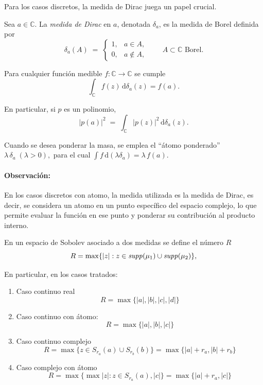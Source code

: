 Para los casos discretos, la medida de Dirac juega un papel crucial.

\begin{definition}\label{def:dirac_measure}
  Sea $a\in\mathbb{C}$.
  La \emph{medida de Dirac} en $a$, denotada $\delta_{a}$, es la medida de Borel definida por
  \[
    \delta_{a}(A)\;=\;
    \begin{cases}
      1, & a\in A,    \\
      0, & a\notin A,
    \end{cases}
    \qquad A\subset\mathbb C \text{ Borel}.
  \]

  Para cualquier función medible \(f\colon\mathbb{C}\to\mathbb{C}\) se cumple
  \[
    \int_{\mathbb C} f(z)\,\mathrm d\delta_{a}(z)=f(a).
  \]

  En particular, si \(p\) es un polinomio,
  \[
    |p(a)|^{2}\;=\;
    \int_{\mathbb C} |p(z)|^{2}\,\mathrm d\delta_{a}(z).
  \]

  Cuando se desea ponderar la masa, se emplea el “átomo ponderado”
  \(
  \lambda\,\delta_{a}\;( \lambda>0),
  \)
  para el cual
  \(
  \displaystyle \int f\,\mathrm d(\lambda\delta_{a})=\lambda\,f(a).
  \)
\end{definition}

\paragraph{Observación:}
En los casos discretos con atomo, la medida utilizada es la medida de Dirac, es decir, se considera un atomo en un punto específico del espacio complejo, lo que permite evaluar la función en ese punto y ponderar su contribución al producto interno.

\begin{definition}
  \label{rem:R_support}
  \noindent En un espacio de Sobolev asociado a dos medidas se define el número  $R$
  $$
    R= \max \{ \vert z \vert : z\in {\it supp}(\mu_1)\cup {\it supp}(\mu_2)\},
  $$
\end{definition}
\noindent En particular, en los casos tratados:
\begin{enumerate}
  \item Caso continuo real
        $$
          R= \max \{ \vert a \vert,\vert b \vert, \vert c \vert, \vert d \vert\}
        $$
  \item Caso continuo con átomo:
        $$
          R= \max \{\vert a \vert, \vert b \vert, \vert c \vert\}
        $$
  \item Caso continuo complejo
        $$
          R=\max \{ z \in S_{r_a}(a)\cup S_{r_b}(b)\}= \max \{ \vert a \vert + r_{a}, \vert b \vert + r_b \}
        $$
  \item Caso complejo con átomo
        $$
          R= \max\{ \max{\vert z \vert : z\in S_{r_a}(a)}, \vert c \vert \}= \max \{ \vert a \vert + r_a,\vert c \vert \}
        $$
\end{enumerate}

